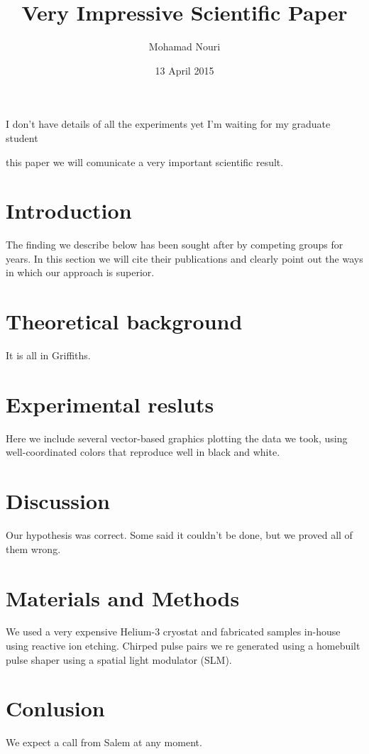 I don't have details of all the experiments yet I'm waiting for my graduate student\documentclass[11pt]{amsart}
\title{Very Impressive Scientific Paper}
\author{Mohamad Nouri}
\date{13 April 2015}
\begin{document}
\In this paper we will comunicate a very important scientific result.

\section{Introduction}

The finding we describe below has been sought after by competing groups
 for years. In this section we will cite their publications and clearly 
point out the ways in which our approach is superior.

\section{Theoretical background}

It is all in Griffiths.

\section{Experimental resluts}

Here we include several vector-based graphics plotting the data we
 took, using well-coordinated colors that reproduce well in black and 
white.

\section{Discussion}

Our hypothesis was correct. Some said it couldn't be done, but we
proved all of them wrong.

\section{Materials and Methods}

We used a very expensive Helium-3 cryostat and fabricated samples 
in-house using reactive ion etching. Chirped pulse pairs we re
generated using a homebuilt pulse shaper using a spatial light
 modulator (SLM).

\section{Conlusion} 

We expect a call from Salem at any moment.
\end{document}

